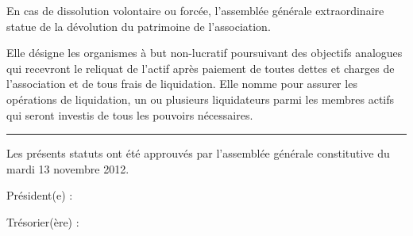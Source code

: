 \documentclass[a4paper, 11pt]{article}
\newcommand{\dateAGC}{mardi 13 novembre 2012}
\newcommand\sep{\noindent\rule{\linewidth}{.5pt}}
\begin{document}
En cas de dissolution volontaire ou forcée, l'assemblée générale extraordinaire statue de la dévolution du patrimoine de
l'association.

Elle désigne les organismes à but non-lucratif poursuivant des objectifs analogues qui recevront le reliquat de l'actif
après paiement de toutes dettes et charges de l'association et de tous frais de liquidation. Elle nomme pour assurer les
opérations de liquidation, un ou plusieurs liquidateurs parmi les membres actifs qui seront investis de tous les
pouvoirs nécessaires.



\bigskip\bigskip

\sep

\bigskip\bigskip

Les présents statuts ont été approuvés par l'assemblée générale constitutive du \dateAGC.

\bigskip\bigskip

Président(e) :


\bigskip\bigskip

Trésorier(ère) :
\end{document}
